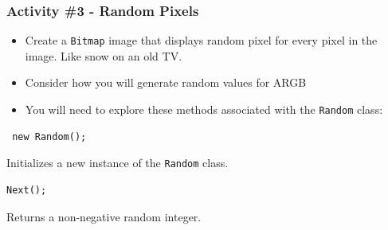 \begin{frame}[fragile]
	\frametitle{Activity \#3 - Random Pixels}

\begin{itemize}		
	\item Create a \texttt{Bitmap} image that displays random pixel for every pixel in the image. Like snow on an old TV.
	\item Consider how you will generate random values for ARGB
	\item You will need to explore these methods associated with the \texttt{Random} class:
	
\end{itemize}
	
\begin{lstlisting}
 new Random();
\end{lstlisting}
Initializes a new instance of the \texttt{Random} class.
\begin{lstlisting}
Next();
\end{lstlisting}
Returns a non-negative random integer.

\end{frame}

